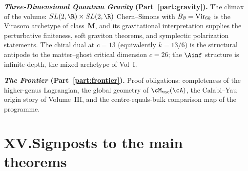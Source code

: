 \smallskip
\noindent\textbf{\emph{Three-Dimensional Quantum Gravity}
(Part~\ref{part:gravity}).}\enspace
The climax of the volume: $SL(2,\R) \times SL(2,\R)$ Chern--Simons
with $B_{\partial} = \mathrm{Vir}_{6k}$ is the Virasoro archetype of
class~$\mathbf{M}$, and its gravitational interpretation supplies
the perturbative finiteness, soft graviton theorems, and
symplectic polarization statements. The chiral dual at $c = 13$
(equivalently $k = 13/6$) is the structural antipode to the
matter--ghost critical dimension $c = 26$; the $\Ainf$ structure
is infinite-depth, the mixed archetype of Vol~I.

\smallskip
\noindent\textbf{\emph{The Frontier}
(Part~\ref{part:frontier}).}\enspace
Proof obligations: completeness of the higher-genus Lagrangian,
the global geometry of $\cM_{\mathrm{vac}}(\cA)$, the
Calabi--Yau origin story of Volume~III, and the centre-equals-bulk
comparison map of the programme.

\section*{XV.\quad Signposts to the main theorems}

